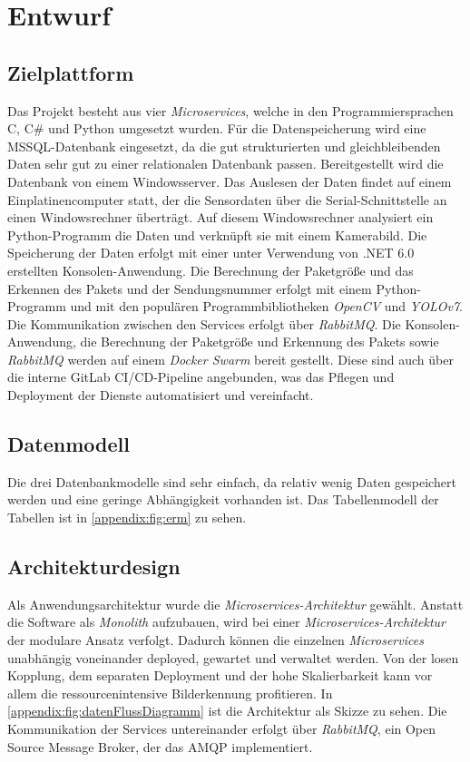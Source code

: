 \section{Entwurf}\label{sec:Entwurf}


\subsection{Zielplattform}

Das Projekt besteht aus vier \textit{\gls{Microservices}}, welche in den Programmiersprachen C, C\# und Python umgesetzt wurden. Für die Datenspeicherung wird eine MSSQL-Datenbank eingesetzt, da die gut strukturierten und gleichbleibenden Daten sehr gut zu einer relationalen Datenbank passen. Bereitgestellt wird die Datenbank von einem Windowsserver. Das Auslesen der Daten findet auf einem Einplatinencomputer statt, der die Sensordaten über die Serial-Schnittstelle an einen Windowsrechner überträgt. Auf diesem Windowsrechner analysiert ein Python-Programm die Daten und verknüpft sie mit einem Kamerabild. Die Speicherung der Daten erfolgt mit einer unter Verwendung von .NET 6.0 erstellten Konsolen-Anwendung. Die Berechnung der Paketgröße und das Erkennen des Pakets und der Sendungsnummer erfolgt mit einem Python-Programm und mit den populären Programmbibliotheken \textit{\gls{OpenCV}} und \textit{\gls{YOLOv7}}. Die Kommunikation zwischen den Services erfolgt über \textit{\gls{RabbitMQ}}. Die Konsolen-Anwendung, die Berechnung der Paketgröße und Erkennung des Pakets sowie \textit{\gls{RabbitMQ}} werden auf einem \textit{\gls{Docker Swarm}} bereit gestellt. Diese sind auch über die interne GitLab \ac{CI/CD}-Pipeline angebunden, was das Pflegen und Deployment der Dienste automatisiert und vereinfacht.

\subsection{Datenmodell}

Die drei Datenbankmodelle sind sehr einfach, da relativ wenig Daten gespeichert werden und eine geringe Abhängigkeit vorhanden ist. Das Tabellenmodell der Tabellen ist in \vref{appendix:fig:erm} zu sehen.


\subsection{Architekturdesign}

Als Anwendungsarchitektur wurde die \textit{\gls{Microservices-Architektur}} gewählt. Anstatt die Software als \textit{\gls{Monolith}} aufzubauen, wird bei einer \textit{\gls{Microservices-Architektur}} der modulare Ansatz verfolgt. Dadurch können die einzelnen \textit{\gls{Microservices}} unabhängig voneinander deployed, gewartet und verwaltet werden. Von der losen Kopplung, dem separaten Deployment und der hohe Skalierbarkeit kann vor allem die ressourcenintensive Bilderkennung profitieren. In \vref{appendix:fig:datenFlussDiagramm} ist die Architektur als Skizze zu sehen. Die Kommunikation der Services untereinander erfolgt über \textit{\gls{RabbitMQ}}, ein Open Source Message Broker, der das \ac{AMQP} implementiert.


